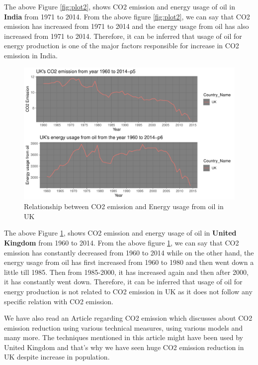 \documentclass[11pt,a4paper,]{article}
\begin{document}
The above Figure \ref{fig:plot2}, shows CO2 emission and energy usage of oil in \textbf{India} from 1971 to 2014. From the above figure \ref{fig:plot2}, we can say that CO2 emission has increased from 1971 to 2014 and the energy usage from oil has also increased from 1971 to 2014. Therefore, it can be inferred that usage of oil for energy production is one of the major factors responsible for increase in CO2 emission in India.

\begin{figure}

{\centering \includegraphics{report_files/figure-latex/plot3-1} 

}

\caption{Relationship between CO2 emission and Energy usage from oil in UK}\label{fig:plot3}
\end{figure}

The above Figure \ref{fig:plot3}, shows CO2 emission and energy usage of oil in \textbf{United Kingdom} from 1960 to 2014. From the above figure \ref{fig:plot3}, we can say that CO2 emission has constantly decreased from 1960 to 2014 while on the other hand, the energy usage from oil has first increased from 1960 to 1980 and then went down a little till 1985. Then from 1985-2000, it has increased again and then after 2000, it has constantly went down. Therefore, it can be inferred that usage of oil for energy production is not related to CO2 emission in UK as it does not follow any specific relation with CO2 emission.

We have also read an Article regarding CO2 emission \textcite{article} which discusses about CO2 emission reduction using various technical measures, using various models and many more. The techniques mentioned in this article might have been used by United Kingdom and that's why we have seen huge CO2 emission reduction in UK despite increase in population.
\end{document}
